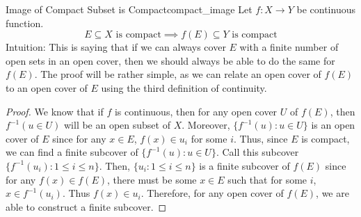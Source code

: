 \begin{thm}{Image of Compact Subset is Compact}{compact_image}
Let \(f: X \to Y\) be continuous function. 
\begin{equation*}
  E \subseteq X \textrm{ is compact} \implies f(E) \subseteq Y \textrm{ is compact}
\end{equation*}
Intuition: This is saying that if we can always cover \(E\) with a finite number of open sets in an open cover, then we should always be able to do the same for \(f(E)\). The proof will be rather simple, as we can relate an open cover of \(f(E)\) to an open cover of \(E\) using the third definition of continuity.


\begin{proof}
We know that if \(f\) is continuous, then for any open cover \(U\) of \(f(E)\), then \(f^{-1}(u\in U)\) will be an open subset of \(X\). Moreover, \(\{f^{-1}(u) : u \in U\}\) is an open cover of \(E\) since for any \(x \in E\), \(f(x) \in u_i\) for some \(i\). Thus, since \(E\) is compact, we can find a finite subcover of \(\{f^{-1}(u) : u \in U\}\). Call this subcover \(\{f^{-1}(u_i) : 1 \leq i \leq n\}\). Then, \(\{ u_i : 1 \leq i \leq n\}\) is a finite subcover of \(f(E)\) since for any \(f(x) \in f(E)\), there must be some \(x \in E\) such that for some \(i\), \(x \in f^{-1}(u_i)\). Thus \(f(x) \in u_i\). Therefore, for any open cover of \(f(E)\), we are able to construct a finite subcover.
\end{proof}

\end{thm}

